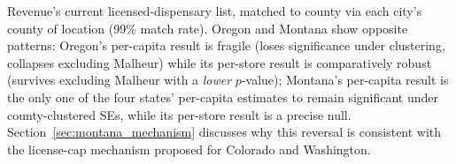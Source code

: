 \begin{table}[htbp]
\begin{minipage}{0.95\textwidth}
Revenue's current licensed-dispensary list, matched to county via each city's county of location (99\%
match rate). Oregon and Montana show opposite patterns: Oregon's per-capita result is fragile (loses
significance under clustering, collapses excluding Malheur) while its per-store result is comparatively
robust (survives excluding Malheur with a \emph{lower} $p$-value); Montana's per-capita result is the only
one of the four states' per-capita estimates to remain significant under county-clustered SEs, while its
per-store result is a precise null. Section~\ref{sec:montana_mechanism} discusses why this reversal is
consistent with the license-cap mechanism proposed for Colorado and Washington.
\end{minipage}
\end{table}
